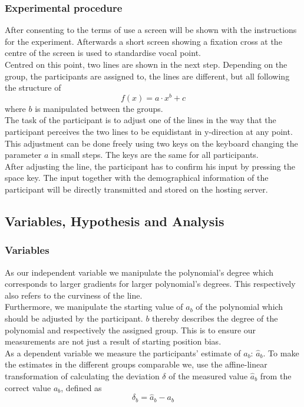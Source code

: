 \documentclass[a4paper, doc, draftall]{apa6}
\begin{document}
		\subsubsection{Experimental procedure}
			After consenting to the terms of use a screen will be shown with the instructions for the experiment. Afterwards a short screen showing a fixation cross at the centre of the screen is used to standardise vocal point.\\
			Centred on this point, two lines are shown in the next step. Depending on the group, the participants are assigned to, the lines are different, but all following the structure of 
			$$ f(x) = a \cdot x^b + c $$
			where $b$ is manipulated between the groups.\\
			The task of the participant is to adjust one of the lines in the way that the participant perceives the two lines to be equidistant in y-direction at any point. This adjustment can be done freely using two keys %
			on the keyboard changing the parameter $a$ in small steps. The keys are the same for all participants.\\ 
			After adjusting the line, the participant has to confirm his input by pressing the space key. The input together with the demographical information of the participant will be directly transmitted and stored on the hosting server.
			
	\subsection{Variables, Hypothesis and Analysis}
		\subsubsection{Variables}
			As our independent variable we manipulate the polynomial's degree which corresponds to larger gradients for larger polynomial's degrees. This respectively also refers to the curviness of the line.\\
			Furthermore, we manipulate the starting value of $a_b$ of the polynomial which should be adjusted by the participant. $b$ thereby describes the degree of the polynomial and respectively the assigned group. This is to ensure our measurements are not just a result of starting position bias.\\			
			As a dependent variable we measure the participants' estimate of $a_b$: $\hat{a}_b$. To make the estimates in the different groups comparable we, use the affine-linear transformation of calculating the deviation $\delta$ of the measured value $\hat{a}_b$ from the correct value $a_b$, defined as
			$$\delta_b = \hat{a}_b - a_b$$
			
\end{document}
